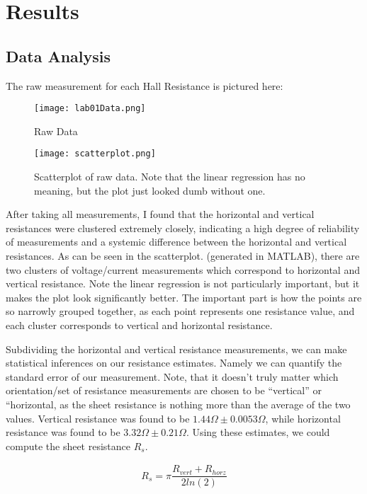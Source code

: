 \section{Results}
\subsection{Data Analysis}
The raw measurement for each Hall Resistance is pictured here:

\begin{figure}[hbt!]
\centering
\texttt{[image: lab01Data.png]}
\caption{Raw Data}\label{fig:rawdata}
\end{figure}

\begin{figure}[hbt!]
\centering
\texttt{[image: scatterplot.png]}
\caption{Scatterplot of raw data. Note that the linear regression has no meaning, but the plot just looked dumb without one.}\label{fig:scatterplot}
\end{figure}

	After taking all measurements, I found that the horizontal and vertical resistances were clustered extremely closely, indicating a high degree of reliability of measurements and a systemic difference between the horizontal and vertical resistances. As can be seen in the scatterplot. (generated in MATLAB), there are two clusters of voltage/current measurements which correspond to horizontal and vertical resistance. Note the linear regression is not particularly important, but it makes the plot look significantly better. The important part is how the points are so narrowly grouped together, as each point represents one resistance value, and each cluster corresponds to vertical and horizontal resistance.

Subdividing the horizontal and vertical resistance measurements, we can make statistical inferences on our resistance estimates. Namely we can quantify the standard error of our measurement. Note, that it doesn’t truly matter which orientation/set of resistance measurements are chosen to be “vertical” or “horizontal, as the sheet resistance is nothing more than the average of the two values. Vertical resistance was found to be $1.44\Omega \pm 0.0053 \Omega$, while horizontal resistance was found to be $3.32\Omega \pm 0.21 \Omega$.
Using these estimates, we could compute the sheet resistance $R_s$.

\begin{align}
	R_s = \pi\dfrac{R_{vert}+R_{horz}}{2 ln(2)}
\end{align}

